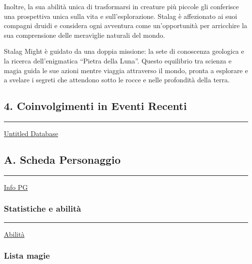 Inoltre, la sua abilità unica di trasformarsi in creature più piccole
gli conferisce una prospettiva unica sulla vita e sull'esplorazione.
Stalag è affezionato ai suoi compagni druidi e considera ogni avventura
come un'opportunità per arricchire la sua comprensione delle meraviglie
naturali del mondo.

Stalag Might è guidato da una doppia missione: la sete di conoscenza
geologica e la ricerca dell'enigmatica ``Pietra della Luna''. Questo
equilibrio tra scienza e magia guida le sue azioni mentre viaggia
attraverso il mondo, pronta a esplorare e a svelare i segreti che
attendono sotto le rocce e nelle profondità della terra.

\subsection{4. Coinvolgimenti in Eventi
Recenti}\label{coinvolgimenti-in-eventi-recenti}

\begin{center}\rule{0.5\linewidth}{0.5pt}\end{center}

\href{Untitled\%20Database\%20da6a05127a584f75a0bd57df6960b00a.csv}{Untitled
Database}

\subsection{A. Scheda Personaggio}\label{a.-scheda-personaggio}

\begin{center}\rule{0.5\linewidth}{0.5pt}\end{center}

\href{Info\%20PG\%20c1cdb90ff3db4272965138ed0c53ac6e.csv}{Info PG}

\subsubsection{Statistiche e abilità}\label{statistiche-e-abilituxe0}

\begin{center}\rule{0.5\linewidth}{0.5pt}\end{center}

\href{Abilita\%CC\%80\%201e7ce6964e984b8d87837edf5c158b9c.csv}{Abilità}

\subsubsection{Lista magie}\label{lista-magie}

